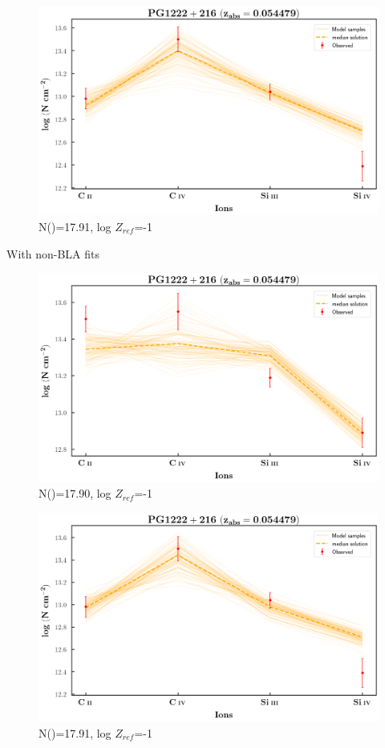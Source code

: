 \documentclass[12pt,draft]{report}
\newcommand\ion[2]{\text{#1\,\textsc{\lowercase{#2}}}}
\begin{document}
\newpage

\begin{figure}[!h]
    \centering
    \includegraphics[width=0.8\linewidth]{Ionisation-Modelling-Plots/pg1222-z=0.054479-compII_logZ=-1.png}
    \caption{N(\ion{H}{i})=17.91, log $Z_{ref}$=-1}
\end{figure}

With non-BLA fits

\begin{figure}[!b]
    \centering
    \includegraphics[width=0.8\linewidth]{Ionisation-Modelling-Plots/pg1222-z=0.054479-compIII_logZ=-1.png}
    \caption{N(\ion{H}{i})=17.90, log $Z_{ref}$=-1}
\end{figure}

\begin{figure}[!t]
    \centering
    \includegraphics[width=1\linewidth]{Ionisation-Modelling-Plots/pg1222-z=0.054479-compIV_logZ=-1.png}
    \caption{N(\ion{H}{i})=17.91, log $Z_{ref}$=-1}
\end{figure}
\end{document}
